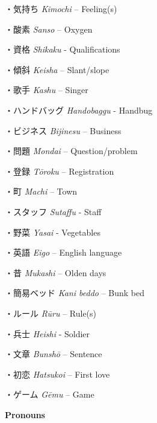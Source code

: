 \par{・気持ち \emph{Kimochi }– Feeling(s) }
 
\par{・酸素 \emph{Sanso }– Oxygen }
 
\par{・資格 \emph{Shikaku }- Qualifications }
 
\par{・傾斜 \emph{Keisha }– Slant\slash slope }
 
\par{・歌手 \emph{Kashu }– Singer }
 
\par{・ハンドバッグ \emph{Handobaggu }- Handbug }
 
\par{・ビジネス \emph{Bijinesu }– Business }
 
\par{・問題 \emph{Mondai }– Question\slash problem }
 
\par{・登録 \emph{Tōroku }– Registration }
 
\par{・町 \emph{Machi }– Town }
 
\par{・スタッフ \emph{Sutaffu }- Staff }
 
\par{・野菜 \emph{Yasai }- Vegetables }
 
\par{・英語 \emph{Eigo }– English language }
 
\par{・昔 \emph{Mukashi }– Olden days }
 
\par{・簡易ベッド \emph{Kan\textquotesingle i beddo }– Bunk bed }
 
\par{・ルール \emph{Rūru }– Rule(s) }
 
\par{・兵士 \emph{Heishi }- Soldier }
 
\par{・文章 \emph{Bunshō }– Sentence }
 
\par{・初恋 \emph{Hatsukoi }– First love }
 
\par{・ゲーム \emph{Gēmu }– Game }
 
\par{\textbf{Pronouns }}
 

